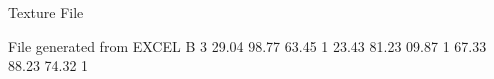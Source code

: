 Texture File

File generated from EXCEL
B 3
29.04 98.77 63.45 1
23.43 81.23 09.87 1
67.33 88.23 74.32 1
